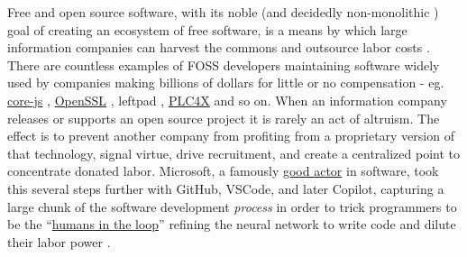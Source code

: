 Free and open source software, with its noble (and decidedly
non-monolithic \cite{liuFreedomIsnFree2018} ) goal of creating an
ecosystem of free software, is
a means by which large information companies can harvest the commons and
outsource labor costs \cite{warkHackerManifesto2004, goldsmithOriginalSinFree2019, hallidayOpenSourceNot2018, hunterReclaimingComputingCommons2016, hornPostOpenSource2020} . There
are countless examples of FOSS developers maintaining software widely
used by companies making billions of dollars for little or no
compensation - eg.
\href{https://github.com/zloirock/core-js/blob/master/docs/2023-02-14-so-whats-next.md}{core-js}
\cite{pushkarevWhatNext2023} ,
\href{https://veridicalsystems.com/blog/of-money-responsibility-and-pride/index.html}{OpenSSL}
\cite{marquessSpeedsFeedsMoney2014} , leftpad \cite{gallagherRagequitCoderUnpublished2016} ,
\href{https://github.com/chrisdutz/blog/blob/main/plc4x/free-trial-expired.adoc}{PLC4X}
\cite{dutzYourFreeTrial2022}  and so on. When an information
company releases or supports an open source project it is rarely an act
of altruism. The effect is to prevent another company from profiting
from a proprietary version of that technology, signal virtue, drive
recruitment, and create a centralized point to concentrate donated
labor. Microsoft, a famously
\href{https://en.wikipedia.org/wiki/Embrace,_extend,_and_extinguish}{good
actor} in software, took this several steps further with GitHub, VSCode,
and later Copilot, capturing a large chunk of the software development
\emph{process} in order to trick programmers to be the
``\href{https://twitter.com/json_dirs/status/1410897161277956097}{humans
in the loop}'' refining the neural network to write code and dilute
their labor power \cite{butterickGitHubCopilotInvestigation2022, butterickGitHubCopilotLitigation2022, olearyVSCodeWhat2022, VSCodiumOpenSource} .

